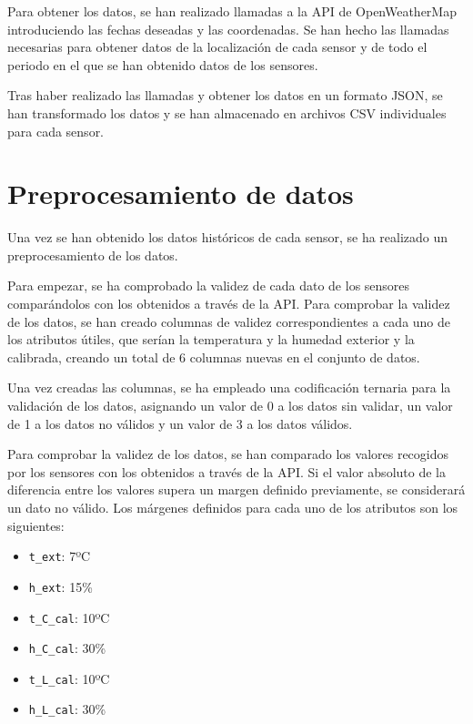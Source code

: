 \par

Para obtener los datos, se han realizado llamadas a la API de OpenWeatherMap introduciendo las fechas deseadas y las coordenadas. Se han hecho las llamadas necesarias para obtener datos de la localización de cada sensor y de todo el periodo en el que se han obtenido datos de los sensores.

\par

Tras haber realizado las llamadas y obtener los datos en un formato JSON, se han transformado los datos y se han almacenado en archivos CSV individuales para cada sensor.

\section{Preprocesamiento de datos}

Una vez se han obtenido los datos históricos de cada sensor, se ha realizado un preprocesamiento de los datos.

\par

Para empezar, se ha comprobado la validez de cada dato de los sensores comparándolos con los obtenidos a través de la API. Para comprobar la validez de los datos, se han creado columnas de validez correspondientes a cada uno de los atributos útiles, que serían la temperatura y la humedad exterior y la calibrada, creando un total de 6 columnas nuevas en el conjunto de datos.

\par

Una vez creadas las columnas, se ha empleado una codificación ternaria para la validación de los datos, asignando un valor de 0 a los datos sin validar, un valor de 1 a los datos no válidos y un valor de 3 a los datos válidos.

\par

Para comprobar la validez de los datos, se han comparado los valores recogidos por los sensores con los obtenidos a través de la API. Si el valor absoluto de la diferencia entre los valores supera un margen definido previamente, se considerará un dato no válido. Los márgenes definidos para cada uno de los atributos son los siguientes:

\begin{itemize}
    \item \texttt{t\_ext}: 7ºC
    \item \texttt{h\_ext}: 15\% 
    \item \texttt{t\_C\_cal}: 10ºC
    \item \texttt{h\_C\_cal}: 30\%
    \item \texttt{t\_L\_cal}: 10ºC
    \item \texttt{h\_L\_cal}: 30\%
\end{itemize}

